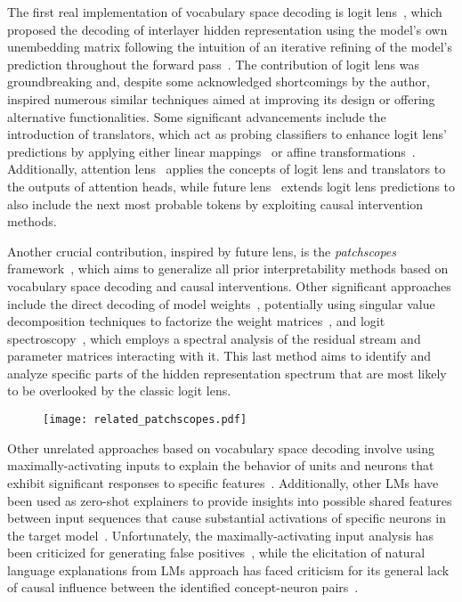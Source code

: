 The first real implementation of vocabulary space decoding is logit lens~\cite{nostalgebraist2020}, which proposed the decoding of interlayer hidden representation using the model's own unembedding matrix following the intuition of an iterative refining of the model's prediction throughout the forward pass~\cite{jastrzebski2018}.
The contribution of logit lens was groundbreaking and, despite some acknowledged shortcomings by the author, inspired numerous similar techniques aimed at improving its design or offering alternative functionalities.
Some significant advancements include the introduction of translators, which act as probing classifiers to enhance logit lens' predictions by applying either linear mappings~\cite{din2024} or affine transformations~\cite{belrose2023a}.
Additionally, attention lens~\cite{sakarvadia2023} applies the concepts of logit lens and translators to the outputs of attention heads, while future lens~\cite{pal2023} extends logit lens predictions to also include the next most probable tokens by exploiting causal intervention methods.

Another crucial contribution, inspired by future lens, is the \emph{patchscopes} framework~\cite{ghandeharioun2024}, which aims to generalize all prior interpretability methods based on vocabulary space decoding and causal interventions.
Other significant approaches include the direct decoding of model weights~\cite{dar2023}, potentially using singular value decomposition techniques to factorize the weight matrices~\cite{millidge2022}, and logit spectroscopy~\cite{cancedda2024}, which employs a spectral analysis of the residual stream and parameter matrices interacting with it.
This last method aims to identify and analyze specific parts of the hidden representation spectrum that are most likely to be overlooked by the classic logit lens.

\begin{figure}[t!]
    \centering
    \texttt{[image: related\_patchscopes.pdf]}
    \caption{}
    \label{fig:related_patchscopes}
\end{figure}

Other unrelated approaches based on vocabulary space decoding involve using maximally-activating inputs to explain the behavior of units and neurons that exhibit significant responses to specific features~\cite{dalvi2019}.
Additionally, other LMs have been used as zero-shot explainers to provide insights into possible shared features between input sequences that cause substantial activations of specific neurons in the target model~\cite{bills2023}.
Unfortunately, the maximally-activating input analysis has been criticized for generating false positives~\cite{bolukbasi2021}, while the elicitation of natural language explanations from LMs approach has faced criticism for its general lack of causal influence between the identified concept-neuron pairs~\cite{huang2023}.


